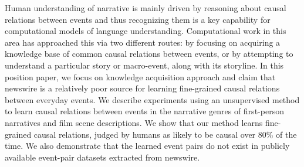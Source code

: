 Human understanding of narrative is mainly driven by reasoning about causal relations between events and thus recognizing them is a key capability for computational models of language understanding. Computational work in this area has approached this via two different routes: by focusing on acquiring a knowledge base of common causal relations between events, or by attempting to understand a particular story or macro-event, along with its storyline. In this position paper, we focus on knowledge acquisition approach and claim that newswire is a relatively poor source for learning fine-grained causal relations between everyday events. We describe experiments using an unsupervised method to learn causal relations between events in the narrative genres of first-person narratives and film scene descriptions. We show that our method learns fine-grained causal relations, judged by humans as likely to be causal over 80\% of the time. We also demonstrate that the learned event pairs do not exist in publicly available event-pair datasets extracted from newswire.
